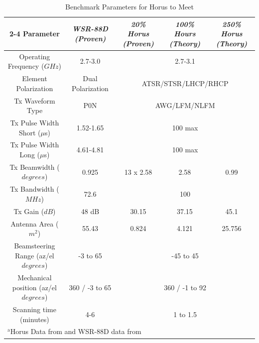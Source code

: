 \documentclass[conference]{IEEEtran}
\begin{document}
\vspace{12pt}
\begin{table}[htbp]
\caption{Benchmark Parameters for Horus to Meet}
\begin{tabular}{|c|c|c|c|c|}
\hline
\cline{2-4} 
\textbf{Parameter} & \textbf{\textit{WSR-88D (Proven)}}& \textbf{\textit{20\% Horus (Proven)}}& \textbf{\textit{100\% Hours (Theory)}} & \textbf{\textit{250\% Horus (Theory)}} \\
\hline
Operating Frequency ($GHz$)&2.7-3.0&\multicolumn{3}{c|}{2.7-3.1}\\
\hline
Element Polarization&Dual Polarization&\multicolumn{3}{c|}{ATSR/STSR/LHCP/RHCP}\\
\hline
Tx Waveform Type&P0N&\multicolumn{3}{c|}{AWG/LFM/NLFM}\\
\hline
Tx Pulse Width Short ($\mu$s)&1.52-1.65&\multicolumn{3}{c|}{100 max}\\
\hline
Tx Pulse Width Long ($\mu$s)&4.61-4.81&\multicolumn{3}{c|}{100 max}\\
\hline
Tx Beamwidth ($degrees$)&0.925&13 x 2.58&2.58&0.99\\
\hline
Tx Bandwidth ($MHz$)&72.6&\multicolumn{3}{c|}{100}\\
\hline
Tx Gain ($dB$)&48 dB&30.15&37.15&45.1\\
\hline
Antenna Area ($m^2$)&55.43&0.824&4.121&25.756\\
\hline
Beamsteering Range (az/el $degrees$)&-3 to 65&\multicolumn{3}{c|}{-45 to 45}\\
\hline
Mechanical position (az/el $degrees$)&360 / -3 to 65&\multicolumn{3}{c|}{360 / -1 to 92}\\
\hline
Scanning time (minutes)&4-6&\multicolumn{3}{c|}{1 to 1.5}\\
\hline
\multicolumn{5}{l}{$^{\mathrm{a}}$Horus Data from \cite{b1} and WSR-88D data from \cite{b5}}
\end{tabular}
\label{tab1}
\end{table}
\end{document}
